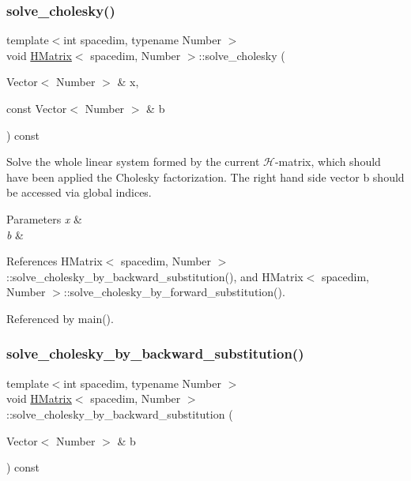 \subsubsection{\texorpdfstring{solve\+\_\+cholesky()}{solve\_cholesky()}}
{\footnotesize\ttfamily template$<$int spacedim, typename Number $>$ \\
void \hyperlink{classHMatrix}{H\+Matrix}$<$ spacedim, Number $>$\+::solve\+\_\+cholesky (\begin{DoxyParamCaption}\item[{Vector$<$ Number $>$ \&}]{x,  }\item[{const Vector$<$ Number $>$ \&}]{b }\end{DoxyParamCaption}) const}

Solve the whole linear system formed by the current $\mathcal{H}$-\/matrix, which should have been applied the Cholesky factorization. The right hand side vector {\ttfamily b} should be accessed via global indices.


\begin{DoxyParams}{Parameters}
{\em x} & \\
\hline
{\em b} & \\
\hline
\end{DoxyParams}


References H\+Matrix$<$ spacedim, Number $>$\+::solve\+\_\+cholesky\+\_\+by\+\_\+backward\+\_\+substitution(), and H\+Matrix$<$ spacedim, Number $>$\+::solve\+\_\+cholesky\+\_\+by\+\_\+forward\+\_\+substitution().



Referenced by main().

\mbox{\label{classHMatrix_a054ad84d52a9ee6df9df3bda0a17cfb7}} 
\subsubsection{\texorpdfstring{solve\+\_\+cholesky\+\_\+by\+\_\+backward\+\_\+substitution()}{solve\_cholesky\_by\_backward\_substitution()}\hspace{0.1cm}{\footnotesize\ttfamily [1/4]}}
{\footnotesize\ttfamily template$<$int spacedim, typename Number $>$ \\
void \hyperlink{classHMatrix}{H\+Matrix}$<$ spacedim, Number $>$\+::solve\+\_\+cholesky\+\_\+by\+\_\+backward\+\_\+substitution (\begin{DoxyParamCaption}\item[{Vector$<$ Number $>$ \&}]{b }\end{DoxyParamCaption}) const}


